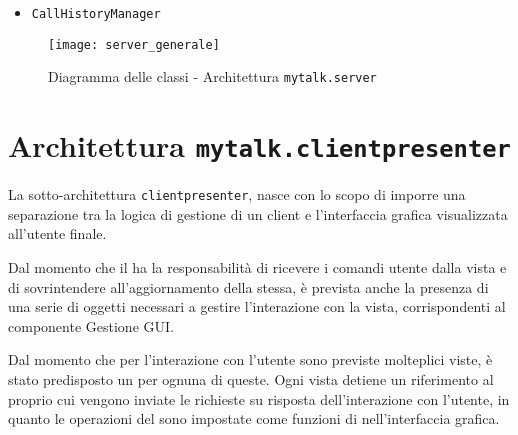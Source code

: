 \begin{itemize}[leftmargin=0em]
\item \texttt{CallHistoryManager}

\end{itemize}

\begin{figure}[H]
  \centering
  \texttt{[image: server\_generale]}
  \caption{Diagramma delle classi - Architettura \texttt{mytalk.server}}\label{fig:sottoarchserver}
\end{figure}
\clearpage

\section{Architettura \texttt{mytalk.clientpresenter}}\label{sec:clientpresenter}
La sotto-architettura \texttt{clientpresenter}, nasce con lo scopo di imporre una separazione tra la logica di gestione di un client e l'interfaccia grafica visualizzata all'utente finale.

Dal momento che il  ha la responsabilità di ricevere i comandi utente dalla vista e di sovrintendere all'aggiornamento della stessa, è prevista anche la presenza di una serie di oggetti necessari a gestire l'interazione con la vista, corrispondenti al componente \textsf{Gestione GUI}.

Dal momento che per l'interazione con l'utente sono previste molteplici viste, è stato predisposto un  per ognuna di queste. Ogni vista detiene un riferimento al proprio  cui vengono inviate le richieste su risposta dell'interazione con l'utente, in quanto le operazioni del  sono impostate come funzioni di  nell'interfaccia grafica.

